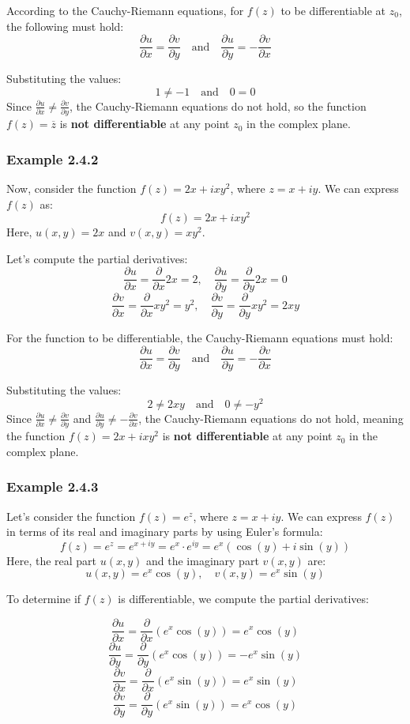 \documentclass[12pt]{book}
\newcommand{\pypx}[2]{\frac{\partial #1}{\partial #2}}
\begin{document}
According to the Cauchy-Riemann equations, for \( f(z) \) to be differentiable at \( z_0 \), the following must hold:
\[
\pypx{u}{x} = \pypx{v}{y} \quad \text{and} \quad \pypx{u}{y} = -\pypx{v}{x}
\]

Substituting the values:
\[
1 \neq -1 \quad \text{and} \quad 0 = 0
\]
Since \( \pypx{u}{x} \neq \pypx{v}{y} \), the Cauchy-Riemann equations do not hold, so the function \( f(z) = \overline{z} \) is \textbf{not differentiable} at any point \( z_0 \) in the complex plane.

\subsubsection{Example 2.4.2}

Now, consider the function \( f(z) = 2x + ixy^2 \), where \( z = x + iy \). We can express \( f(z) \) as:
\[
f(z) = 2x + ixy^2
\]
Here, \( u(x,y) = 2x \) and \( v(x,y) = xy^2 \).

Let's compute the partial derivatives:
\[
\pypx{u}{x} = \pypx{}{x}2x = 2, \quad \pypx{u}{y} = \pypx{}{y}2x = 0
\]
\[
\pypx{v}{x} = \pypx{}{x}xy^2 = y^2, \quad \pypx{v}{y} = \pypx{}{y}xy^2 = 2xy
\]

For the function to be differentiable, the Cauchy-Riemann equations must hold:
\[
\pypx{u}{x} = \pypx{v}{y} \quad \text{and} \quad \pypx{u}{y} = -\pypx{v}{x}
\]

Substituting the values:
\[
2 \neq 2xy \quad \text{and} \quad 0 \neq -y^2
\]
Since \( \pypx{u}{x} \neq \pypx{v}{y} \) and \( \pypx{u}{y} \neq -\pypx{v}{x} \), the Cauchy-Riemann equations do not hold, meaning the function \( f(z) = 2x + ixy^2 \) is \textbf{not differentiable} at any point \( z_0 \) in the complex plane.



\subsubsection{Example 2.4.3}
Let's consider the function \( f(z) = e^z \), where \( z = x + iy \). We can express \( f(z) \) in terms of its real and imaginary parts by using Euler's formula:
\[
f(z) = e^z = e^{x+iy} = e^x \cdot e^{iy} = e^x \left( \cos(y) + i \sin(y) \right)
\]
Here, the real part \( u(x,y) \) and the imaginary part \( v(x,y) \) are:
\[
u(x,y) = e^x \cos(y), \quad v(x,y) = e^x \sin(y)
\]

To determine if \( f(z) \) is differentiable, we compute the partial derivatives:

\[
\pypx{u}{x} = \pypx{}{x} \left( e^x \cos(y) \right) = e^x \cos(y)
\]
\[
\pypx{u}{y} = \pypx{}{y} \left( e^x \cos(y) \right) = -e^x \sin(y)
\]
\[
\pypx{v}{x} = \pypx{}{x} \left( e^x \sin(y) \right) = e^x \sin(y)
\]
\[
\pypx{v}{y} = \pypx{}{y} \left( e^x \sin(y) \right) = e^x \cos(y)
\]
\end{document}
